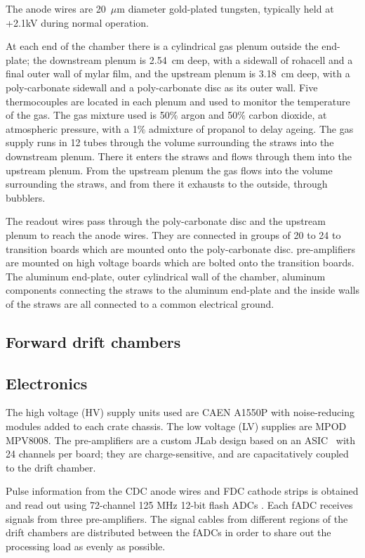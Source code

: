 The anode wires are 20~$\mu$m diameter gold-plated tungsten, typically held at +2.1kV during normal operation. 


At each end of the chamber there is a cylindrical gas plenum outside the end-plate; the downstream plenum is 2.54~cm deep, with a sidewall of rohacell and a final outer wall of mylar film, and the upstream plenum is 3.18~cm deep, with a poly-carbonate sidewall and a poly-carbonate disc as its outer wall. 
Five thermocouples are located in each plenum and used to monitor the temperature of the gas.
The gas mixture used is 50$\%$ argon and 50$\%$ carbon dioxide, at atmospheric pressure, with a 1$\%$ admixture of propanol to delay ageing.
The gas supply runs in 12 tubes through the volume surrounding the straws into the downstream plenum. 
There it enters the straws and flows through them into the upstream plenum. From the upstream plenum the gas flows into the volume surrounding the straws, and from there it exhausts to the outside, through bubblers.

The readout wires pass through the poly-carbonate disc and the upstream plenum to reach the anode wires. 
They are connected in groups of 20 to 24 to transition boards which are mounted onto the poly-carbonate disc. pre-amplifiers\cite{Barbosa2007} are mounted on high voltage boards which are bolted onto the transition boards. The aluminum end-plate, outer cylindrical wall of the chamber, aluminum components connecting the straws to the aluminum end-plate and the inside walls of the straws are all connected to a common electrical ground. 

\subsection{Forward drift chambers \label{sec:fdc}}
\subsection{Electronics \label{sec:dcelectronics}}
The high voltage (HV) supply units used are CAEN A1550P with noise-reducing modules added to each crate chassis. 
The low voltage (LV) supplies are MPOD MPV8008. 
The pre-amplifiers are a custom JLab design based on an ASIC~\cite{Barbosa2008}
with 24 channels per board; they are charge-sensitive, and are capacitatively coupled to the drift chamber. 

Pulse information from the CDC anode wires and FDC cathode strips is obtained and read out using 72-channel 125 MHz 12-bit flash ADCs \cite{Visser2008}. 
Each fADC receives signals from three pre-amplifiers. 
The signal cables from different regions of the drift chambers are distributed between the fADCs in order to share out the processing load as evenly as possible.  

